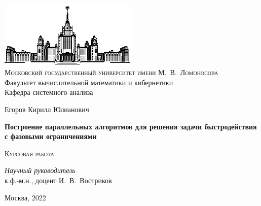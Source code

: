 \thispagestyle{empty}
\begin{center}
    \ \vspace{-3cm}

    \includegraphics[width=0.5\textwidth]{title_page/msu.eps}\\

    {\small{\scshape  Московский государственный университет имени М.~В.~Ломоносова}\\
    Факультет вычислительной математики и кибернетики\\
    Кафедра системного анализа}

    \vfill

    {\Large Егоров Кирилл Юлианович}

    \vspace{1cm}

    {\LARGE\bfseries Построение параллельных алгоритмов для решения задачи быстродействия с фазовыми ограничениями}

    \vspace{1.5cm}

    {\scshape Курсовая работа}
\end{center}

\vspace{3cm}

\begin{flushright}
    \large
    \textit{Научный руководитель}\\
    к.ф.-м.н., доцент И.~В.~Востриков
\end{flushright}

\vfill

\begin{center}
    Москва, 2022
\end{center}

\clearpage